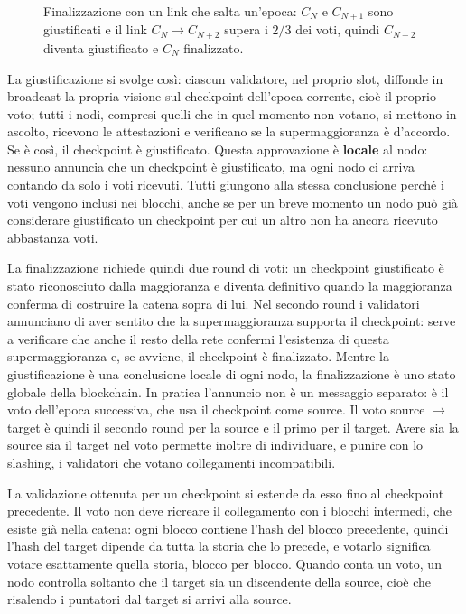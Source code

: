 \documentclass[a4paper, 11pt, oneside]{book}
\begin{document}
	\begin{figure}[H]
		\centering
		
		\caption{Finalizzazione con un link che salta un'epoca: $C_N$ e $C_{N+1}$ sono
			giustificati e il link $C_N \rightarrow C_{N+2}$ supera i $2/3$ dei voti,
			quindi $C_{N+2}$ diventa giustificato e $C_N$ finalizzato.}
		\label{fig:finalizzazione-salto}
	\end{figure}

	La giustificazione si svolge così: ciascun validatore, nel proprio slot, diffonde in
	broadcast la propria visione sul checkpoint dell'epoca corrente, cioè il proprio voto;
	tutti i nodi, compresi quelli che in quel momento non votano, si mettono in ascolto,
	ricevono le attestazioni e verificano se la supermaggioranza è d'accordo. Se è così,
	il checkpoint è giustificato. Questa approvazione è \textbf{locale} al nodo: nessuno
	annuncia che un checkpoint è giustificato, ma ogni nodo ci arriva contando da solo i
	voti ricevuti. Tutti giungono alla stessa conclusione perché i voti vengono inclusi
	nei blocchi, anche se per un breve momento un nodo può già considerare giustificato
	un checkpoint per cui un altro non ha ancora ricevuto abbastanza voti.

	La finalizzazione richiede quindi due round di voti: un checkpoint giustificato è
	stato riconosciuto dalla maggioranza e diventa definitivo quando la maggioranza
	conferma di costruire la catena sopra di lui. Nel secondo round i validatori
	annunciano di aver sentito che la supermaggioranza supporta il checkpoint: serve a
	verificare che anche il resto della rete confermi l'esistenza di questa
	supermaggioranza e, se avviene, il checkpoint è finalizzato. Mentre la giustificazione
	è una conclusione locale di ogni nodo, la finalizzazione è uno stato globale della
	blockchain. In pratica l'annuncio non è un messaggio separato: è il voto dell'epoca
	successiva, che usa il checkpoint come source. Il voto source $\rightarrow$ target è
	quindi il secondo round per la source e il primo per il target. Avere sia la source sia il
	target nel voto permette inoltre di individuare, e punire con lo slashing, i
	validatori che votano collegamenti incompatibili.

	La validazione ottenuta per un checkpoint si estende da esso fino al checkpoint
	precedente. Il voto non deve ricreare il collegamento con i blocchi intermedi, che
	esiste già nella catena: ogni blocco contiene l'hash del blocco precedente, quindi
	l'hash del target dipende da tutta la storia che lo precede, e votarlo significa
	votare esattamente quella storia, blocco per blocco. Quando conta un voto, un nodo
	controlla soltanto che il target sia un discendente della source, cioè che risalendo
	i puntatori dal target si arrivi alla source.
\end{document}
